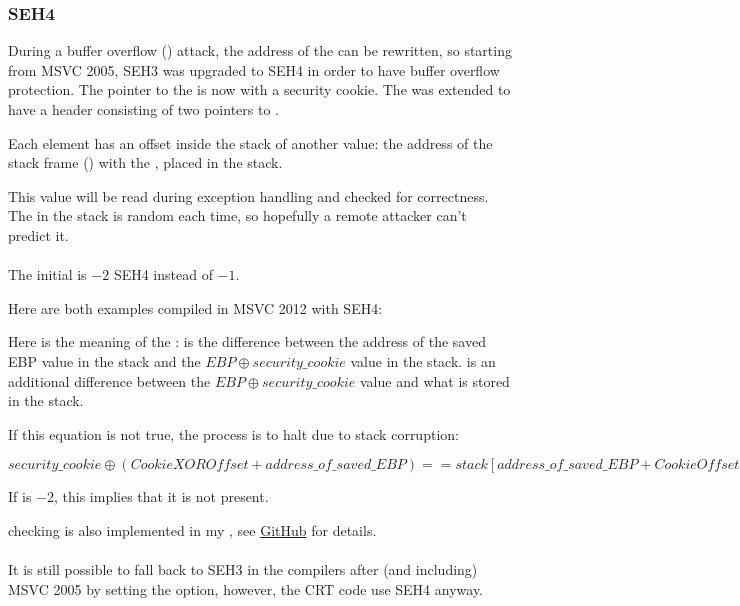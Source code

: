 \subsubsection{SEH4}

\myindex{\BufferOverflow}
During a buffer overflow () attack, the address of the  
can be rewritten, so starting from MSVC 2005, SEH3 was upgraded to SEH4 in order to have buffer overflow protection.
The pointer to the  is now  with a \gls{security cookie}.
The  was extended to have a header consisting of two pointers to .

Each element has an offset inside the stack of another value: 
the address of the \gls{stack frame} (\EBP)  with the  , placed in the stack.

This value will be read during exception handling and checked for correctness.
The  in the stack is random each time, so hopefully a remote attacker can't predict it. \\
\\
The initial  is $-2$ \InENRU SEH4 instead of $-1$.

\def\SEHfour{1}


Here are both examples compiled in MSVC 2012 with SEH4:





Here is the meaning of the :  
is the difference between the address of the saved EBP value in the stack
and the $EBP \oplus security\_cookie$ value in the stack.
 is an additional difference between the 
$EBP \oplus security\_cookie$ value and what is
stored in the stack.

If this equation is not true, the process is to halt due to stack corruption:

\begin{center}
$security\_cookie \oplus (CookieXOROffset + address\_of\_saved\_EBP) == stack[address\_of\_saved\_EBP + CookieOffset]$
\end{center}

If  is $-2$, this implies that it is not present.

 checking is also implemented in my \tracer{},
see \href{http://go.yurichev.com/17061}{GitHub} for details.\\
\\
It is still possible to fall back to SEH3 in the compilers after 
(and including) MSVC 2005 by setting the  option,
however, the \ac{CRT} code use SEH4 anyway.

